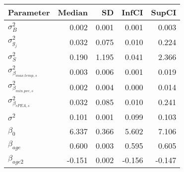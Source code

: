 \begin{table}[ht]
\centering
\begin{tabular}{lrrrr}
  \hline
Parameter & Median & SD & InfCI & SupCI \\ 
  \hline
$\sigma^{2}_{B}$ & 0.002 & 0.001 & 0.001 & 0.003 \\ 
  $\sigma^{2}_{g_{j}}$ & 0.032 & 0.075 & 0.010 & 0.224 \\ 
  $\sigma^{2}_{S}$ & 0.190 & 1.195 & 0.041 & 2.366 \\ 
  $\sigma^{2}_{\beta_{max.temp,s}}$ & 0.003 & 0.006 & 0.001 & 0.019 \\ 
  $\sigma^{2}_{\beta_{min.pre,s}}$ & 0.002 & 0.004 & 0.000 & 0.014 \\ 
  $\sigma^{2}_{\beta_{rPEA,s}}$ & 0.032 & 0.085 & 0.010 & 0.241 \\ 
  $\sigma^{2}$ & 0.101 & 0.001 & 0.099 & 0.103 \\ 
  $\beta_{0}$ & 6.337 & 0.366 & 5.602 & 7.106 \\ 
  $\beta_{age}$ & 0.600 & 0.003 & 0.595 & 0.605 \\ 
  $\beta_{age2}$ & -0.151 & 0.002 & -0.156 & -0.147 \\ 
   \hline
\end{tabular}
\end{table}
